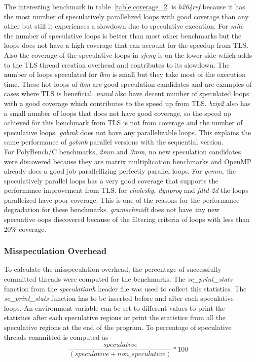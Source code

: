 \documentclass[10pt]{report}          %
\begin{document}
The interesting benchmark in table~\ref{table:coverage_2} is \textit{h264ref} because it has the most number of speculatively parallelized loops with good coverage than any other but still it experiences a slowdown due to speculative execution.  For \textit{milc} the number of speculative loops is better than most other benchmarks but the loops does not have a high coverage that can account for the speedup from TLS.  Also the coverage of the speculative loops in \textit{sjeng} is on the lower side which adds to the TLS thread creation overhead and contributes to its slowdown.  The number of loops speculated for \textit{lbm} is small but they take most of the execution  time.  These hot loops of \textit{lbm} are good speculation candidates and are examples of cases where TLS is beneficial.  \textit{namd} also have decent number of speculated loops with a good coverage which contributes to the speed up from TLS.  \textit{bzip2} also has a small number of loops that does not have good coverage, so the speed up achieved for this benchmark from TLS is not from coverage and the number of speculative loops. \textit{gobmk} does not have any parallelizable loops.  This explains the same performance of \textit{gobmk} parallel versions with the sequential version. \\

For PolyBench/C benchmarks, \textit{2mm} and \textit{3mm}, no new speculation candidates were discovered because they are matrix multiplication benchmarks and OpenMP already does a good job parallellizing perfectly parallel loops. For \textit{gemm}, the speculatively parallel loops has a very good coverage that supports the performance improvement from TLS.  for \textit{cholesky, dynprog} and \textit{fdtd-2d} the loops paralleized have poor coverage.  This is one of the reasons for the performance degradation for these benchmarks. \textit{gramschmidt} does not have any new specuative oops discovered because of the filtering criteria of loops with less than 20\% coverage.

\subsubsection{Misspeculation Overhead}

To calculate the misspeculation overhead, the percentage of successfully committed threads were computed for the benchmarks.  The \textit{se\_print\_stats} function from the \textit{speculation\.h} header file was used to collect this statistics.  The \textit{se\_print\_stats} function has to be inserted before and after each speculative loops.  An environment variable can be set to different values to print the statistics after each speculative regions or print the statistics from all the speculative regions at the end of the program.  To percentage of speculative threads committed is computed as -
\begin{equation}
 \frac{speculative }{\left ( speculative + non\_speculative \right )}\ast 100
\end{equation}
\end{document}
